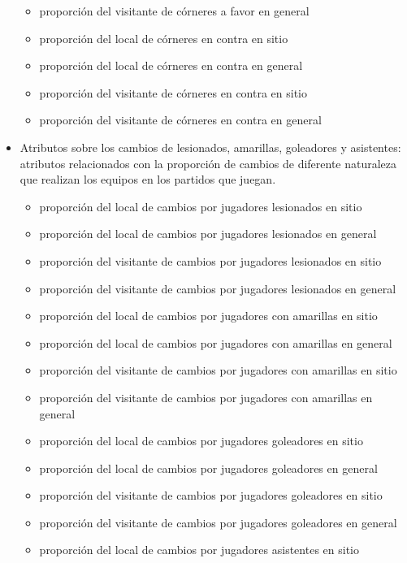 \begin{itemize}
\begin{itemize}
              \item proporción del visitante de córneres a favor en general
              \item proporción del local de córneres en contra en sitio
              \item proporción del local de córneres en contra en general
              \item proporción del visitante de córneres en contra en sitio
              \item proporción del visitante de córneres en contra en general
          \end{itemize}
    \item Atributos sobre los cambios de lesionados, amarillas, goleadores y asistentes: atributos relacionados con la proporción de cambios de diferente naturaleza que realizan los equipos en los partidos que juegan.
          \begin{itemize}
              \item proporción del local de cambios por jugadores lesionados en sitio
              \item proporción del local de cambios por jugadores lesionados en general
              \item proporción del visitante de cambios por jugadores lesionados en sitio
              \item proporción del visitante de cambios por jugadores lesionados en general
              \item proporción del local de cambios por jugadores con amarillas en sitio
              \item proporción del local de cambios por jugadores con amarillas en general
              \item proporción del visitante de cambios por jugadores con amarillas en sitio
              \item proporción del visitante de cambios por jugadores con amarillas en general
              \item proporción del local de cambios por jugadores goleadores en sitio
              \item proporción del local de cambios por jugadores goleadores en general
              \item proporción del visitante de cambios por jugadores goleadores en sitio
              \item proporción del visitante de cambios por jugadores goleadores en general
              \item proporción del local de cambios por jugadores asistentes en sitio

\end{itemize}
\end{itemize}
